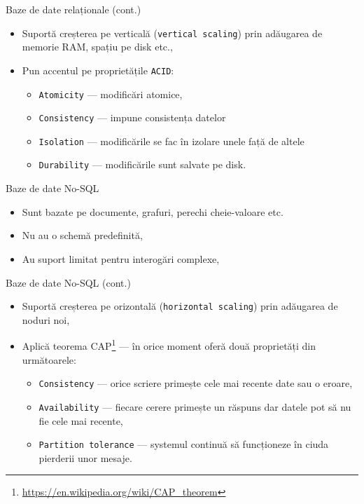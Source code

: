 \documentclass[presentation]{beamer}
\begin{document}
\begin{frame}[label={sec:org2ee4677},fragile]{Baze de date relaționale (cont.)}
 \begin{itemize}
\item Suportă creșterea pe verticală (\texttt{vertical scaling}) prin adăugarea de memorie RAM, spațiu pe disk etc.,
\item Pun accentul pe proprietățile \texttt{ACID}:
\begin{itemize}
\item \texttt{Atomicity} --- modificări atomice,
\item \texttt{Consistency} --- impune consistența datelor
\item \texttt{Isolation} --- modificările se fac în izolare unele față de altele
\item \texttt{Durability} --- modificările sunt salvate pe disk.
\end{itemize}
\end{itemize}
\end{frame}
\begin{frame}[label={sec:orgc446632}]{Baze de date No-SQL}
\begin{itemize}
\item Sunt bazate pe documente, grafuri, perechi cheie-valoare etc.
\item \alert{Nu} au o schemă predefinită,
\item Au suport limitat pentru interogări complexe,
\end{itemize}
\end{frame}
\begin{frame}[label={sec:orgc840f59},fragile]{Baze de date No-SQL (cont.)}
 \begin{itemize}
\item Suportă creșterea pe orizontală (\texttt{horizontal scaling}) prin adăugarea de noduri noi,
\item Aplică teorema CAP\footnote{\url{https://en.wikipedia.org/wiki/CAP\_theorem}} --- în orice moment oferă două proprietăți din următoarele:
\begin{itemize}
\item \texttt{Consistency} --- orice scriere primește cele mai recente date sau o eroare,
\item \texttt{Availability} --- fiecare cerere primește un răspuns dar datele pot să nu fie cele mai recente,
\item \texttt{Partition tolerance} --- systemul continuă să funcționeze în ciuda pierderii unor mesaje.
\end{itemize}
\end{itemize}
\end{frame}
\end{document}
